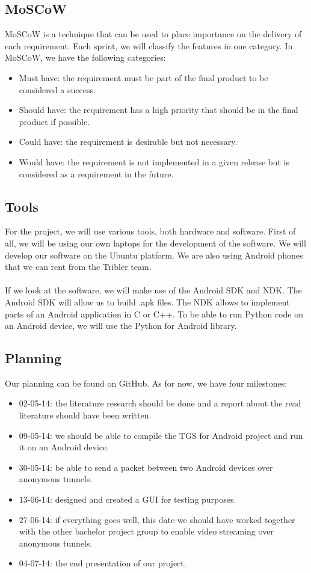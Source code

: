 \subsection{MoSCoW}
MoSCoW is a technique that can be used to place importance on the delivery of each requirement. Each sprint, we will classify the features in one category. In MoSCoW, we have the following categories:
\begin{itemize}
\item Must have: the requirement must be part of the final product to be considered a success.
\item Should have: the requirement has a high priority that should be in the final product if possible.
\item Could have: the requirement is desirable but not necessary.
\item Would have: the requirement is not implemented in a given release but is considered as a requirement in the future.
\end{itemize}

\subsection{Tools}
For the project, we will use various tools, both hardware and software. First of all, we will be using our own laptops for the development of the software. We will develop our software on the Ubuntu platform. We are also using Android phones that we can rent from the Tribler team.\\\\
If we look at the software, we will make use of the Android SDK and NDK. The Android SDK will allow us to build .apk files. The NDK allows to implement parts of an Android application in C or C++. To be able to run Python code on an Android device, we will use the Python for Android library.

\subsection{Planning}
Our planning can be found on GitHub. As for now, we have four milestones:
\begin{itemize}
\item 02-05-14: the literature research should be done and a report about the read literature should have been written.
\item 09-05-14: we should be able to compile the TGS for Android project and run it on an Android device.
\item 30-05-14: be able to send a packet between two Android devices over anonymous tunnels.
\item 13-06-14: designed and created a GUI for testing purposes.
\item 27-06-14: if everything goes well, this date we should have worked together with the other bachelor project group to enable video streaming over anonymous tunnels.
\item 04-07-14: the end presentation of our project.
\end{itemize}


